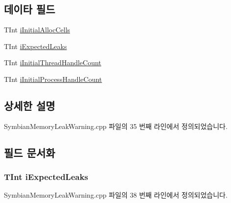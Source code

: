 \subsection*{데이타 필드}
\begin{DoxyCompactItemize}
\item 
T\+Int \hyperlink{class_memory_leak_warning_data_a8486c917ec96ae308d0e2d08a6be40c3}{i\+Initial\+Alloc\+Cells}
\item 
T\+Int \hyperlink{class_memory_leak_warning_data_ad57c722b8a43e635133784e2db8bab34}{i\+Expected\+Leaks}
\item 
T\+Int \hyperlink{class_memory_leak_warning_data_a083ba8276e92f5bb5db1ad91736efbbe}{i\+Initial\+Thread\+Handle\+Count}
\item 
T\+Int \hyperlink{class_memory_leak_warning_data_a99a92506b8f1a0569fbf67193a7fb725}{i\+Initial\+Process\+Handle\+Count}
\end{DoxyCompactItemize}


\subsection{상세한 설명}


Symbian\+Memory\+Leak\+Warning.\+cpp 파일의 35 번째 라인에서 정의되었습니다.



\subsection{필드 문서화}
\subsubsection[{\texorpdfstring{i\+Expected\+Leaks}{iExpectedLeaks}}]{\setlength{\rightskip}{0pt plus 5cm}T\+Int i\+Expected\+Leaks}\hypertarget{class_memory_leak_warning_data_ad57c722b8a43e635133784e2db8bab34}{}\label{class_memory_leak_warning_data_ad57c722b8a43e635133784e2db8bab34}


Symbian\+Memory\+Leak\+Warning.\+cpp 파일의 38 번째 라인에서 정의되었습니다.

